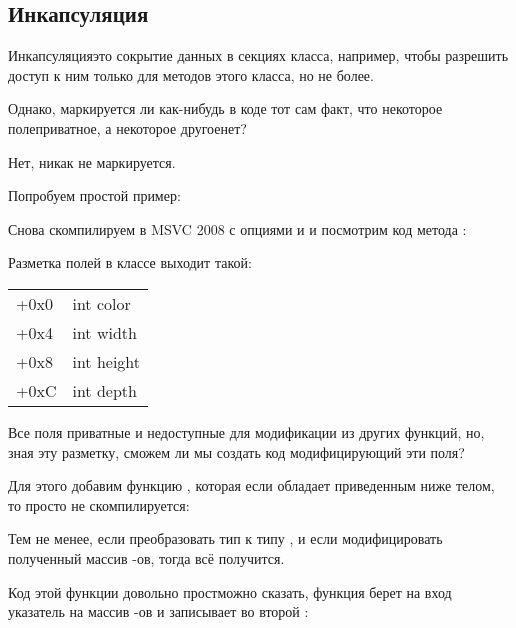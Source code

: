 \subsection{Инкапсуляция}

Инкапсуляция\EMDASH{}это сокрытие данных в  секциях класса, например, чтобы разрешить доступ к ним только 
для методов этого класса, но не более.

Однако, маркируется ли как-нибудь в коде тот сам факт, что некоторое поле\EMDASH{}приватное, 
а некоторое другое\EMDASH{}нет?

Нет, никак не маркируется.

Попробуем простой пример:



Снова скомпилируем в MSVC 2008 с опциями \Ox и \Obzero и посмотрим код метода :



Разметка полей в классе выходит такой:

\begin{center}
\begin{tabular}{ | l | l | }
\hline
  \tableheader{} \\
\hline
  +0x0 & int color \\
\hline
  +0x4 & int width \\
\hline
  +0x8 & int height \\
\hline
  +0xC & int depth \\
\hline
\end{tabular}
\end{center}

Все поля приватные и недоступные для модификации из других функций, но, зная эту разметку, 
сможем ли мы создать код модифицирующий эти поля? 

Для этого добавим функцию , которая если обладает 
приведенным ниже телом, то просто не скомпилируется:



Тем не менее, если преобразовать тип  к типу , 
и если модифицировать полученный массив \Tint{}-ов, тогда всё получится.



Код этой функции довольно прост\EMDASH{}можно сказать, функция берет на вход указатель на массив \Tint{}-ов и 
записывает  во второй \Tint{}:

